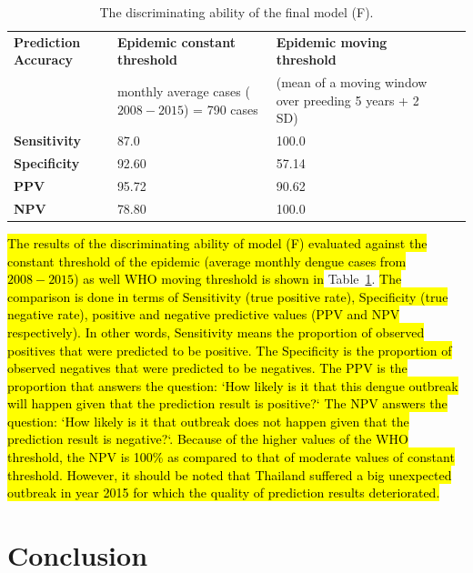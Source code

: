 \documentclass{bmcart}
\begin{document}
\begin{table}
	\centering
	\label{my-label}
	\begin{tabular}{|l|p{4.0cm}|p{4.0cm}|ll}
		\hline
		\textbf{Prediction Accuracy} & \textbf{Epidemic constant threshold}  & \textbf{Epidemic moving threshold} \\
		& monthly average cases ($2008-2015$) = 790 cases  & (mean of a moving window over preeding 5 years + 2 SD) \\  \cline{1-3}
		\textbf{Sensitivity} & 87.0  & 100.0  \\ 
		\textbf{Specificity} & 92.60 &  57.14  \\ 
		\textbf{PPV} & 95.72 &  90.62         \\ 
		\textbf{NPV} & 78.80  &  100.0        \\\cline{1-3}
	\end{tabular}
	\caption{The discriminating ability of the final model (F).} 
	\label{tab:resultsBinary}
\end{table}

\hl{The  results of the discriminating ability of model (F) evaluated against the constant threshold of the epidemic (average monthly dengue cases from $2008-2015$) as well WHO moving threshold is shown in} Table~\ref{tab:resultsBinary}. \hl{The comparison is done in terms of Sensitivity (true positive rate), Specificity (true negative rate), positive and negative predictive values (PPV and NPV respectively).  In other words, Sensitivity means the proportion of observed positives that were predicted to be positive. The Specificity is the proportion of observed negatives that were predicted to be negatives. The PPV is the proportion that answers the question: `How likely is it that this dengue outbreak will happen given that the prediction result is positive?` The NPV answers the question: `How likely is it that outbreak does not happen given that the prediction result is negative?`. Because of the higher values of the WHO threshold, the NPV is 100\% as compared to that of moderate values of constant threshold. However, it should be noted that Thailand suffered a big unexpected outbreak in year 2015 for which the quality of prediction results deteriorated.}




\section{Conclusion} \label{discussion}
\end{document}
